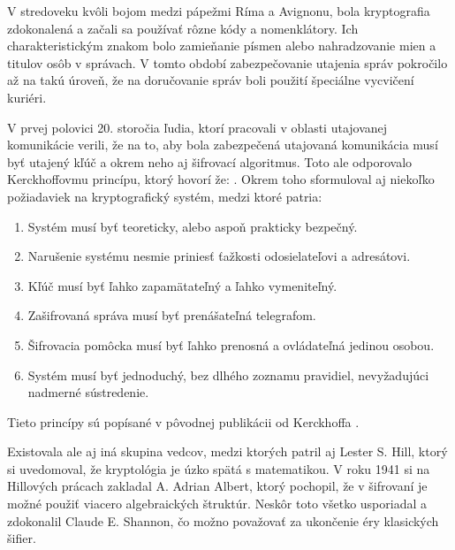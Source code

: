 V stredoveku kvôli bojom medzi pápežmi Ríma a Avignonu, bola kryptografia zdokonalená a začali sa používať rôzne kódy a nomenklátory.
Ich charakteristickým znakom bolo zamieňanie písmen alebo nahradzovanie mien a titulov osôb v správach.
V tomto období zabezpečovanie utajenia správ pokročilo až na takú úroveň, že na doručovanie správ boli použití špeciálne vycvičení kuriéri.

V prvej polovici 20. storočia ľudia, ktorí pracovali v oblasti utajovanej komunikácie verili, že na to, aby bola zabezpečená utajovaná komunikácia musí byť utajený kľúč a okrem neho aj šifrovací algoritmus. Toto ale odporovalo Kerckhoffovmu princípu, ktorý hovorí že: . Okrem toho sformuloval aj niekoľko požiadaviek na kryptografický systém, medzi ktoré patria:
\begin{enumerate}
\item Systém musí byť teoreticky, alebo aspoň prakticky bezpečný.
\item Narušenie systému nesmie priniesť ťažkosti odosielateľovi a adresátovi.
\item Kľúč musí byť ľahko zapamätateľný a ľahko vymeniteľný.
\item Zašifrovaná správa musí byť prenášateľná telegrafom.
\item Šifrovacia pomôcka musí byť ľahko prenosná a ovládateľná jedinou osobou.
\item Systém musí byť jednoduchý, bez dlhého zoznamu pravidiel, nevyžadujúci nadmerné sústredenie.
\end{enumerate}
Tieto princípy sú popísané v pôvodnej publikácii od Kerckhoffa \cite{kerckhoff}.

Existovala ale aj iná skupina vedcov, medzi ktorých patril aj Lester S. Hill, ktorý si uvedomoval, že kryptológia je úzko spätá s matematikou.
V roku 1941 si na Hillových prácach zakladal A. Adrian Albert, ktorý pochopil, že v šifrovaní je možné použiť viacero algebraických štruktúr.
Neskôr toto všetko usporiadal a zdokonalil Claude E. Shannon, čo možno považovať za ukončenie éry klasických šifier.


